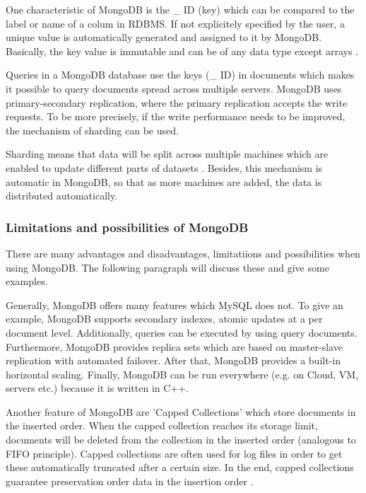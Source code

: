 One characteristic of MongoDB is the {\_} ID (key) which can be compared to the label or name of a colum in RDBMS. If not explicitely specified by the user, a unique value is automatically generated and assigned  to it by MongoDB. Basically, the key value is immutable and can be of any data type except arrays \cite[p.31 ff.]{mongodb_edward}.

Queries in a MongoDB database use the keys ({\_} ID) in documents which makes it possible to query documents spread across multiple servers. 
MongoDB uses primary-secondary replication, where the primary replication accepts the write requests. To be more precisely, if the write performance needs to be improved, the mechanism of sharding can be used. 

Sharding means that data will be split across multiple machines which are enabled to update different parts of datasets \cite[p.25 ff.]{mongodb_edward}. Besides, this mechanism is automatic in MongoDB, so that as more machines are added, the data is distributed automatically.

\subsubsection{Limitations and possibilities of MongoDB}

There are many advantages and disadvantages, limitatiions and possibilities when using MongoDB. The following paragraph will discuss these and give some examples.

Generally, MongoDB offers many features which MySQL does not. To give an example, MongoDB supports secondary indexes, atomic updates at a per document level. Additionally, queries can be executed by using query documents. Furthermore, MongoDB provides replica sets which are based on master-slave replication with automated failover. After that, MongoDB provides a built-in horizontal scaling. Finally, MongoDB can be run everywhere (e.g. on Cloud, \ac{VM}, servers etc.) because it is written in C++. 

Another feature of MongoDB are 'Capped Collections' which store documents in the inserted order. When the capped collection reaches its storage limit, documents will be deleted from the collection in the inserted order (analogous to \ac{FIFO} principle). Capped collections are often used for log files in order to get these automatically truncated after a certain size. In the end, capped collections guarantee preservation order data in the insertion order \cite[p.31 ff.]{mongodb_edward}.


